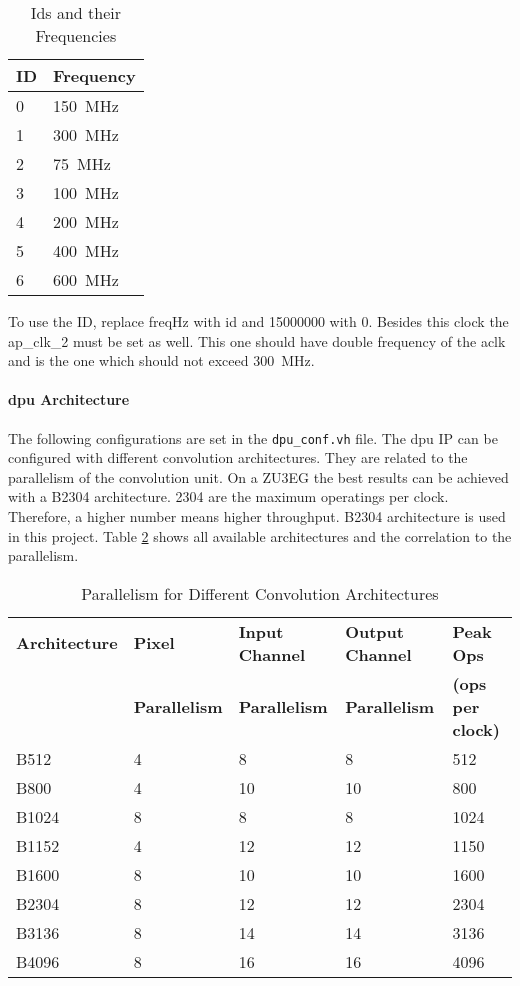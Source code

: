 \begin{table}[hb]
  \caption{Ids and their Frequencies}
  \label{tab:frequencies_ids}
  \centering
  \begin{tabular}{ll}
    \toprule
    \textbf{ID} & \textbf{Frequency} \\
    \midrule
    0 & \SI{150}{MHz} \\
    1 & \SI{300}{MHz} \\
    2 & \SI{75}{MHz} \\
    3 & \SI{100}{MHz} \\
    4 & \SI{200}{MHz} \\
    5 & \SI{400}{MHz} \\
    6 & \SI{600}{MHz} \\
    \bottomrule
  \end{tabular}
\end{table}

To use the ID, replace freqHz with id and 15000000 with 0.
Besides this clock the ap\_clk\_2 must be set as well.
This one should have double frequency of the aclk and is the one which should not exceed \SI{300}{MHz}.

\paragraph{\acrshort{dpu} Architecture}
The following configurations are set in the \texttt{dpu\_conf.vh} file.
The \acrshort{dpu} IP can be configured with different convolution architectures.
They are related to the parallelism of the convolution unit.
On a ZU3EG the best results can be achieved with a B2304 architecture.
2304 are the maximum operatings per clock.
Therefore, a higher number means higher throughput.
B2304 architecture is used in this project.
Table \ref{tab:arch_parallelism} shows all available architectures and the correlation to the parallelism.

\begin{table}[hb]
  \caption{Parallelism for Different Convolution Architectures \cite{dpu_product_guide}}
  \label{tab:arch_parallelism}
  \centering
  \begin{tabular}{lllll}
    \toprule
    \textbf{Architecture} & \textbf{Pixel} & \textbf{Input Channel} & \textbf{Output Channel} & \textbf{Peak Ops} \\
     & \textbf{Parallelism} & \textbf{Parallelism} & \textbf{Parallelism} & \textbf{(ops per clock)} \\
    \midrule
    B512 & 4 & 8 & 8 & 512 \\
    B800 & 4 & 10 & 10 & 800 \\
    B1024 & 8 & 8 & 8 & 1024 \\
    B1152 & 4 & 12 & 12 & 1150 \\
    B1600 & 8 & 10 & 10 & 1600 \\
    B2304 & 8 & 12 & 12 & 2304 \\
    B3136 & 8 & 14 & 14 & 3136 \\
    B4096 & 8 & 16 & 16 & 4096 \\
    \bottomrule
  \end{tabular}
\end{table}

